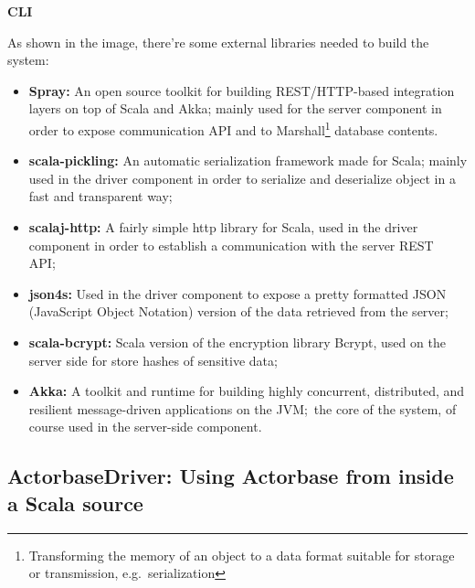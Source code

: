 \documentclass{scalatekids-article}
\begin{document}
\textbf{CLI}


As shown in the image, there're some external libraries needed to build the system:
\begin{itemize}
\item \textbf{Spray:} An open source toolkit for building REST/HTTP-based
  integration layers on top of Scala and Akka; mainly used for the server
  component in order to expose communication API and to
  Marshall\footnote{Transforming the memory of an object to a data format suitable
    for storage or transmission, e.g.\ serialization} database contents.
\item \textbf{scala-pickling:} An automatic serialization framework made for
  Scala; mainly used in the driver component in order to serialize and
  deserialize object in a fast and transparent way;
\item \textbf{scalaj-http:} A fairly simple http library for Scala, used in the
  driver component in order to establish a communication with the server REST API;\
\item \textbf{json4s:} Used in the driver component to expose a pretty formatted
  JSON (JavaScript Object Notation) version of the data retrieved from the server;
\item \textbf{scala-bcrypt:} Scala version of the encryption library Bcrypt,
  used on the server side for store hashes of sensitive data;
\item \textbf{Akka:} A toolkit and runtime for building highly concurrent,
  distributed, and resilient message-driven applications on the JVM;\ the core of
  the system, of course used in the server-side component.
\end{itemize}


\subsection{ActorbaseDriver: Using Actorbase from inside a Scala source}
\end{document}
